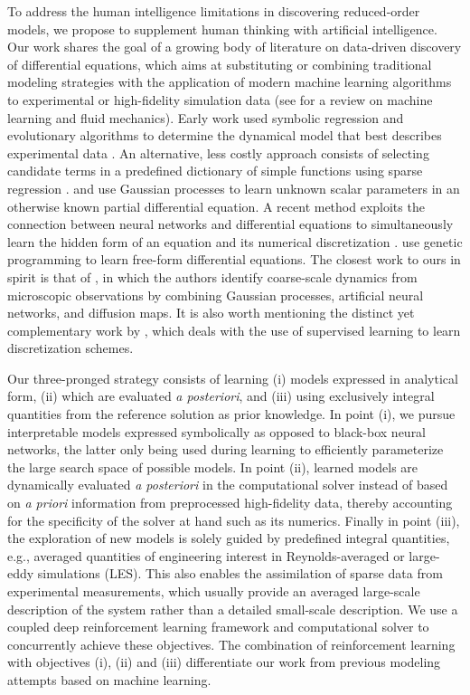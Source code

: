 \documentclass{article}
\begin{document}
To address the human intelligence limitations in discovering
reduced-order models, we propose to supplement human thinking with
artificial intelligence. Our work shares the goal of a growing body of
literature on data-driven discovery of differential equations,
which aims at substituting or combining traditional modeling
strategies with the application of modern machine learning algorithms
to experimental or high-fidelity simulation data
(see \citep{brunton2019machine} for a review on machine learning and fluid mechanics). Early work used symbolic regression and evolutionary
algorithms to determine the dynamical model that best describes
experimental data
\citep{bongard2007automated,schmidt2009distilling}. An alternative,
less costly approach consists of selecting candidate terms in a
predefined dictionary of simple functions using sparse regression
\citep{brunton2016discovering,rudy2017data,schaeffer2017learning,wu2019learning}. \citet{raissi2017physics} and \citet{raissi2018hidden} use Gaussian processes to learn unknown
scalar parameters in an otherwise known partial differential
equation. A recent method exploits the connection between neural
networks and differential equations \citep{chen2018neural} to
simultaneously learn the hidden form of an equation and its numerical
discretization
\citep{long2018pde,long2019pde}. \citet{atkinson2019data} use genetic
programming to learn free-form differential equations. The closest
work to ours in spirit is that of \cite{lee2019coarse}, in which the
authors identify coarse-scale dynamics from microscopic observations
by combining Gaussian processes, artificial neural networks, and
diffusion maps. It is also worth mentioning the distinct yet
complementary work by \citet{bar2019learning}, which deals with the
use of supervised learning to learn discretization schemes.

Our three-pronged strategy consists of learning (i) models expressed
in analytical form, (ii) which are evaluated \emph{a posteriori}, and
(iii) using exclusively integral quantities from the reference
solution as prior knowledge. In point (i), we pursue interpretable
models expressed symbolically as opposed to black-box neural networks,
the latter only being used during learning to efficiently parameterize
the large search space of possible models. In point (ii), learned
models are dynamically evaluated \emph{a posteriori} in the
computational solver instead of based on \emph{a priori} information
from preprocessed high-fidelity data, thereby accounting for the
specificity of the solver at hand such as its numerics. Finally in
point (iii), the exploration of new models is solely guided by
predefined integral quantities, e.g., averaged quantities of
engineering interest in Reynolds-averaged or large-eddy simulations
(LES). This also enables the assimilation of sparse data from
experimental measurements, which usually provide an averaged
large-scale description of the system rather than a detailed small-scale description. We use a coupled deep reinforcement learning
framework and computational solver to concurrently achieve these
objectives. The combination of reinforcement learning with objectives
(i), (ii) and (iii) differentiate our work from previous modeling
attempts based on machine learning.
\end{document}
